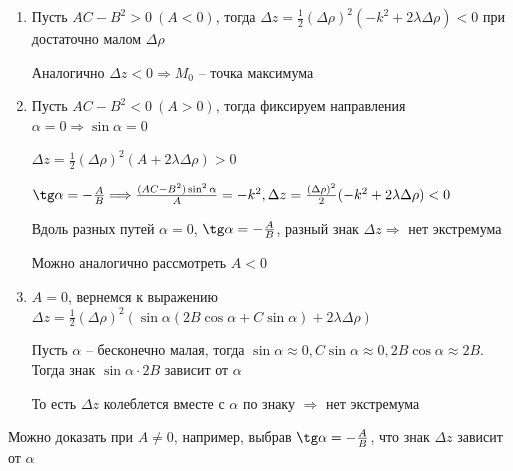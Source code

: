 \documentclass[12pt]{article}
\begin{document}
\begin{MyProof}
\begin{enumerate}
            \item Пусть $AC - B^2 > 0 \ (A < 0)$, тогда $\Delta z = \frac{1}{2}(\Delta \rho)^2 (-k^2 + 2\lambda\Delta\rho) < 0$ при достаточно малом $\Delta \rho$

            Аналогично $\Delta z < 0 \Longrightarrow M_0$ -- точка максимума

            \item Пусть $AC - B^2 < 0 \ (A > 0)$, тогда фиксируем направления $\alpha = 0 \Longrightarrow \sin\alpha = 0$

            $\Delta z = \frac{1}{2}(\Delta \rho)^2 (A + 2\lambda\Delta\rho) > 0$

            $\tg \alpha = -\frac{A}{B} \Longrightarrow \frac{(AC - B^2)\sin^2\alpha}{A} = -k^2, \Delta z = \frac{(\Delta \rho)^2}{2}(-k^2 + 2\lambda\Delta\rho) < 0$

            Вдоль разных путей $\alpha = 0$, $\tg \alpha = -\frac{A}{B}$, разный знак $\Delta z \Longrightarrow$ нет экстремума

            \Notas Можно аналогично рассмотреть $A < 0$

            \item $A = 0$, вернемся к выражению $\Delta z = \frac{1}{2} (\Delta \rho)^2 (\sin\alpha(2B\cos\alpha + C\sin\alpha) + 2\lambda\Delta\rho)$

            Пусть $\alpha$ -- бесконечно малая, тогда $\sin\alpha \approx 0, C\sin\alpha \approx 0, 2B\cos\alpha \approx 2B$. Тогда знак $\sin\alpha \cdot 2B$ зависит от $\alpha$

            То есть $\Delta z$ колеблется вместе с $\alpha$ по знаку $\Longrightarrow$ нет экстремума
        \end{enumerate}

        Можно доказать при $A \neq 0$, например, выбрав $\tg \alpha = -\frac{A}{B}$, что знак $\Delta z$ зависит от $\alpha$

    \end{MyProof}
\end{document}
